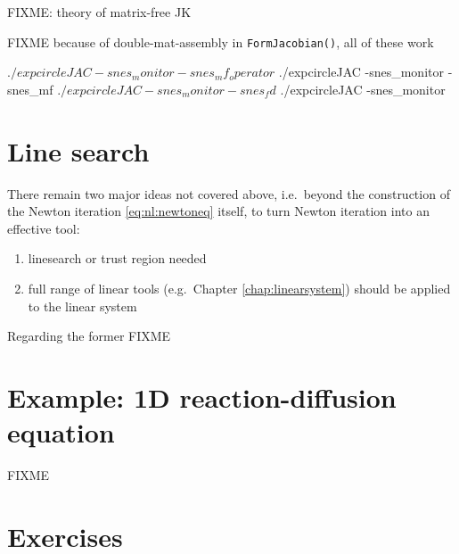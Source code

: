 FIXME: theory of matrix-free JK \cite{KnollKeyes2004}

FIXME because of double-mat-assembly in \texttt{FormJacobian()}, all of these work

\begin{cline}
$ ./expcircleJAC -snes_monitor -snes_mf_operator
$ ./expcircleJAC -snes_monitor -snes_mf
$ ./expcircleJAC -snes_monitor -snes_fd
$ ./expcircleJAC -snes_monitor
\end{cline}


\section{Line search}

There remain two major ideas not covered above, i.e.~beyond the construction of the Newton iteration \eqref{eq:nl:newtoneq} itself, to turn Newton iteration into an effective tool:
\renewcommand{\labelenumi}{\roman{enumi})}
\begin{enumerate}
\item linesearch or trust region needed \citep{Kelley2003}
\item full range of linear tools (e.g.~Chapter \ref{chap:linearsystem}) should be applied to the linear system
\end{enumerate}

Regarding the former FIXME


\section{Example: 1D reaction-diffusion equation}

FIXME

\vfill
{}




\section{Exercises}

